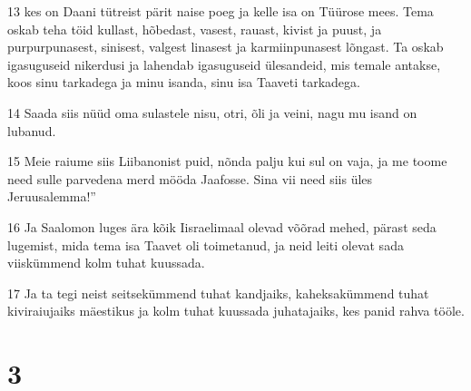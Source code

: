 \par 13 kes on Daani tütreist pärit naise poeg ja kelle isa on Tüürose mees. Tema oskab teha töid kullast, hõbedast, vasest, rauast, kivist ja puust, ja purpurpunasest, sinisest, valgest linasest ja karmiinpunasest lõngast. Ta oskab igasuguseid nikerdusi ja lahendab igasuguseid ülesandeid, mis temale antakse, koos sinu tarkadega ja minu isanda, sinu isa Taaveti tarkadega.
\par 14 Saada siis nüüd oma sulastele nisu, otri, õli ja veini, nagu mu isand on lubanud.
\par 15 Meie raiume siis Liibanonist puid, nõnda palju kui sul on vaja, ja me toome need sulle parvedena merd mööda Jaafosse. Sina vii need siis üles Jeruusalemma!”
\par 16 Ja Saalomon luges ära kõik Iisraelimaal olevad võõrad mehed, pärast seda lugemist, mida tema isa Taavet oli toimetanud, ja neid leiti olevat sada viiskümmend kolm tuhat kuussada.
\par 17 Ja ta tegi neist seitsekümmend tuhat kandjaiks, kaheksakümmend tuhat kiviraiujaiks mäestikus ja kolm tuhat kuussada juhatajaiks, kes panid rahva tööle.

\chapter{3}

